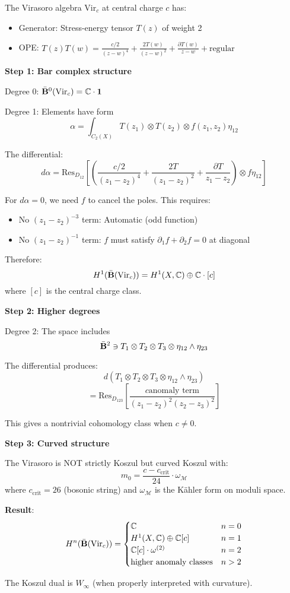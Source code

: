 \begin{example}
The Virasoro algebra $\text{Vir}_c$ at central charge $c$ has:
\begin{itemize}
\item Generator: Stress-energy tensor $T(z)$ of weight 2
\item OPE: $T(z)T(w) = \frac{c/2}{(z-w)^4} + \frac{2T(w)}{(z-w)^2} + \frac{\partial T(w)}{z-w} + \text{regular}$
\end{itemize}

\textbf{Step 1: Bar complex structure}

Degree 0: $\bar{\mathbf{B}}^0(\text{Vir}_c) = \mathbb{C} \cdot \mathbf{1}$

Degree 1: Elements have form
$$\alpha = \int_{C_2(X)} T(z_1) \otimes T(z_2) \otimes f(z_1, z_2)\eta_{12}$$

The differential:
$$d\alpha = \text{Res}_{D_{12}}\left[\left(\frac{c/2}{(z_1-z_2)^4} + \frac{2T}{(z_1-z_2)^2} + \frac{\partial T}{z_1-z_2}\right) \otimes f\eta_{12}\right]$$

For $d\alpha = 0$, we need $f$ to cancel the poles. This requires:
\begin{itemize}
\item No $(z_1-z_2)^{-3}$ term: Automatic (odd function)
\item No $(z_1-z_2)^{-1}$ term: $f$ must satisfy $\partial_1 f + \partial_2 f = 0$ at diagonal
\end{itemize}

Therefore:
$$H^1(\bar{\mathbf{B}}(\text{Vir}_c)) = H^1(X, \mathbb{C}) \oplus \mathbb{C} \cdot [c]$$
where $[c]$ is the central charge class.

\textbf{Step 2: Higher degrees}

Degree 2: The space includes
$$\bar{\mathbf{B}}^2 \ni T_1 \otimes T_2 \otimes T_3 \otimes \eta_{12} \wedge \eta_{23}$$

The differential produces:
$$d(T_1 \otimes T_2 \otimes T_3 \otimes \eta_{12} \wedge \eta_{23})$$
$$= \text{Res}_{D_{123}}\left[\frac{c \text{anomaly term}}{(z_1-z_2)^2(z_2-z_3)^2}\right]$$

This gives a nontrivial cohomology class when $c \neq 0$.

\textbf{Step 3: Curved structure}

The Virasoro is NOT strictly Koszul but curved Koszul with:
$$m_0 = \frac{c - c_{\text{crit}}}{24} \cdot \omega_{\mathcal{M}}$$
where $c_{\text{crit}} = 26$ (bosonic string) and $\omega_{\mathcal{M}}$ is the Kähler form on moduli space.

\textbf{Result}:
$$H^n(\bar{\mathbf{B}}(\text{Vir}_c)) = \begin{cases}
\mathbb{C} & n = 0 \\
H^1(X, \mathbb{C}) \oplus \mathbb{C}[c] & n = 1 \\
\mathbb{C}[c] \cdot \omega^{(2)} & n = 2 \\
\text{higher anomaly classes} & n > 2
\end{cases}$$

The Koszul dual is $W_\infty$ (when properly interpreted with curvature).
\end{example}

